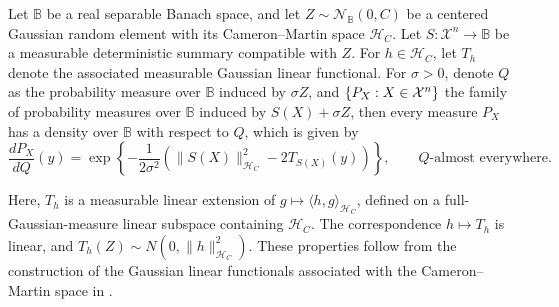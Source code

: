 \begin{lemma}
    \label{lemma: Cameron-Martin Lemma}
    Let $\mathbb{B}$ be a real separable Banach space, and let $Z\sim\mathcal N_{\mathbb B}(0,C)$ be a centered Gaussian random element with its Cameron--Martin space $\mathcal H_C$. Let $S:\mathcal X^n\to\mathbb B$ be a measurable deterministic summary compatible with $Z$. For $h\in\mathcal H_C$, let $T_h$ denote the associated measurable Gaussian linear functional. For $\sigma>0$, denote $Q$ as the probability measure over $\mathbb{B}$ induced by $\sigma Z$, and $\left\{{P_X:X\in \mathcal{X}^n}\right\}$ the family of probability measures over $\mathbb{B}$ induced by $S(X)+ \sigma Z$, then every measure $P_X$ has a density over $\mathbb{B}$ with respect to $Q$, which is given by
    \[
    \frac{dP_X}{dQ}(y)
    =
    \exp\left\{
    -\frac{1}{2\sigma^2}
    \left(
    \|S(X)\|_{\mathcal H_C}^2
    -2T_{S(X)}(y)
    \right)
    \right\},
    \qquad Q\text{-almost everywhere}.
    \]
\end{lemma}

Here, $T_h$ is a measurable linear extension of $g\mapsto\langle h,g\rangle_{\mathcal H_C}$, defined on a full-Gaussian-measure linear subspace containing $\mathcal H_C$. The correspondence $h\mapsto T_h$ is linear, and $T_h(Z)\sim N(0,\|h\|_{\mathcal H_C}^2).$ These properties follow from the construction of the Gaussian linear functionals associated with the Cameron--Martin space in \citet[Section~2.2, Lemma~3.1]{mirshani2019formal}.

